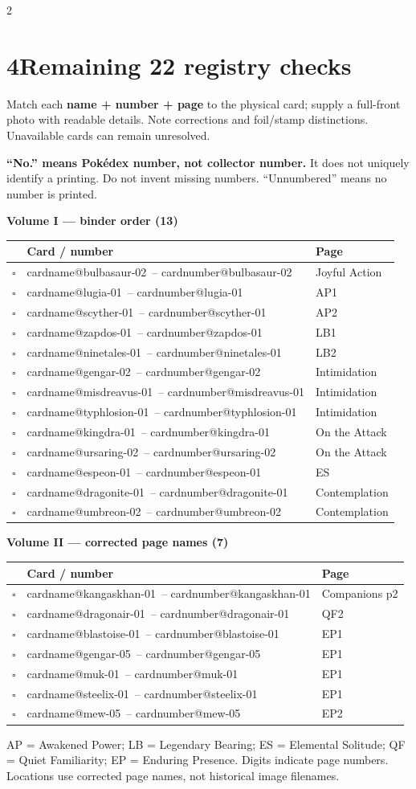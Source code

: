 \documentclass[10pt,a4paper]{article}
\makeatletter
\newcommand{\sub}[1]{\par\vspace{3pt}\textbf{#1}\par}
\newcommand{\id}[1]{\csname cardnumber@#1\endcsname}
\newcommand{\card}[1]{\csname cardname@#1\endcsname\ -- \id{#1}}
\newcommand{\boxx}{$\square$}
\newcommand{\smallnote}[1]{{\fontsize{8.5}{10}\selectfont #1\par}}
\makeatother
\begin{document}
\begin{multicols}{2}
\columnbreak
\section{4\quad Remaining 22 registry checks}
Match each \textbf{name + number + page} to the physical card; supply a full-front photo with readable details. Note corrections and foil/stamp distinctions. Unavailable cards can remain unresolved.

\textbf{``No.'' means Pok\'edex number, not collector number.} It does not uniquely identify a printing. Do not invent missing numbers. ``Unnumbered'' means no number is printed.

\sub{Volume I --- binder order (13)}
\begin{tabularx}{\linewidth}{@{}l l X@{}}
 & \textbf{Card / number} & \textbf{Page}\\\hline
\boxx & \card{bulbasaur-02} & Joyful Action\\
\boxx & \card{lugia-01} & AP1\\
\boxx & \card{scyther-01} & AP2\\
\boxx & \card{zapdos-01} & LB1\\
\boxx & \card{ninetales-01} & LB2\\
\boxx & \card{gengar-02} & Intimidation\\
\boxx & \card{misdreavus-01} & Intimidation\\
\boxx & \card{typhlosion-01} & Intimidation\\
\boxx & \card{kingdra-01} & On the Attack\\
\boxx & \card{ursaring-02} & On the Attack\\
\boxx & \card{espeon-01} & ES\\
\boxx & \card{dragonite-01} & Contemplation\\
\boxx & \card{umbreon-02} & Contemplation\\
\end{tabularx}

\sub{Volume II --- corrected page names (7)}
\begin{tabularx}{\linewidth}{@{}l l X@{}}
 & \textbf{Card / number} & \textbf{Page}\\\hline
\boxx & \card{kangaskhan-01} & Companions p2\\
\boxx & \card{dragonair-01} & QF2\\
\boxx & \card{blastoise-01} & EP1\\
\boxx & \card{gengar-05} & EP1\\
\boxx & \card{muk-01} & EP1\\
\boxx & \card{steelix-01} & EP1\\
\boxx & \card{mew-05} & EP2\\
\end{tabularx}
\smallnote{AP = Awakened Power; LB = Legendary Bearing; ES = Elemental Solitude; QF = Quiet Familiarity; EP = Enduring Presence. Digits indicate page numbers. Locations use corrected page names, not historical image filenames.}


\end{multicols}
\end{document}
